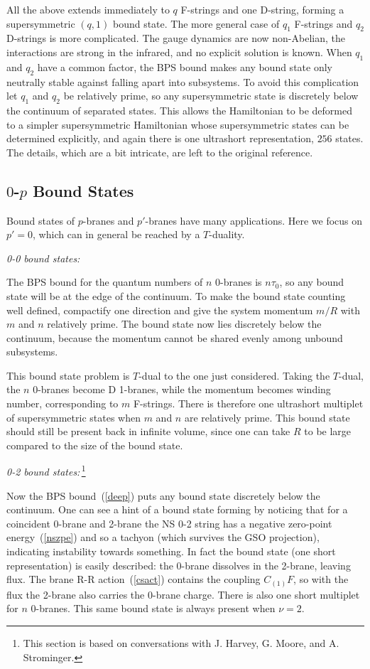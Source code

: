 All the above extends immediately to $q$ F-strings and one D-string, forming
a supersymmetric $(q,1)$ bound state.  The more general case of $q_1$
F-strings and $q_2$ D-strings is more complicated.  The gauge dynamics are
now non-Abelian, the interactions are strong in the infrared, and no explicit
solution is known.  When $q_1$ and $q_2$ have a common factor, the BPS bound
makes any bound state only neutrally stable against falling apart into
subsystems.  To avoid this complication let $q_1$ and $q_2$ be relatively
prime, so any supersymmetric state is discretely below the continuum of
separated states.  This allows the Hamiltonian to be deformed to a simpler
supersymmetric Hamiltonian whose supersymmetric states can be 
determined explicitly, and again there is one ultrashort
representation, $256$ states.  The details, which are a bit intricate,
are left to the original reference.\cite{witbound}

\subsection{$0$-$p$ Bound States}

Bound states of $p$-branes and $p'$-branes have many applications.  Here we
focus on $p' = 0$, which can in general be reached by a $T$-duality.

{\it 0-0 bound states:} 

The BPS bound for the quantum numbers of $n$ 0-branes
is $n \tau_0$, so any bound state will be at the edge of the continuum.  To
make the bound state counting well defined, compactify one direction and give
the system momentum $m/R$ with $m$ and $n$ relatively prime.\cite{senbound} 
The bound state now lies discretely below the continuum, because the momentum
cannot be shared evenly among unbound subsystems.

This bound state problem is $T$-dual to the one just considered.  Taking the
$T$-dual, the $n$ 0-branes become D 1-branes, while the momentum becomes
winding number, corresponding to $m$ F-strings.  There is therefore one
ultrashort multiplet of supersymmetric states when $m$ and $n$ are relatively
prime.\cite{senbound} This bound state should still be present back in infinite
volume, since one can take $R$ to be large compared to the size of the bound
state.

{\it 0-2 bound states:}\,\footnote
{This section is based on conversations with 
J. Harvey, G. Moore, and A. Strominger.}

Now the BPS bound~(\ref{deep}) puts any bound
state discretely below the continuum.  One can see a hint of a bound state
forming by noticing that for a coincident 0-brane and 2-brane the NS 0-2
string has a negative zero-point energy~(\ref{nszpe}) and so a tachyon
(which survives the GSO projection), indicating instability towards
something.  In fact the bound state (one short representation) is easily
described: the 0-brane dissolves in the 2-brane, leaving  flux.  The brane R-R
action~(\ref{csact}) contains the coupling
$C_{(1)} F$, so with the flux the 2-brane also carries the 0-brane
charge.\cite{towndf} There is also one short multiplet for $n$ 0-branes.  This
same bound state is always present when $\nu = 2$.

